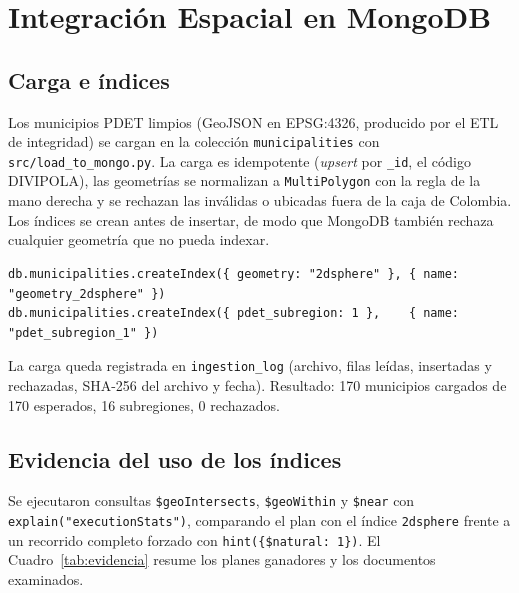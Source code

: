 \documentclass[12pt, letterpaper]{article}
\begin{document}
\section{Integración Espacial en MongoDB}

\subsection{Carga e índices}
Los municipios PDET limpios (GeoJSON en EPSG:4326, producido por el ETL de integridad) se cargan en la colección \texttt{municipalities} con \texttt{src/load\_to\_mongo.py}. La carga es idempotente (\emph{upsert} por \texttt{\_id}, el código DIVIPOLA), las geometrías se normalizan a \texttt{MultiPolygon} con la regla de la mano derecha y se rechazan las inválidas o ubicadas fuera de la caja de Colombia. Los índices se crean antes de insertar, de modo que MongoDB también rechaza cualquier geometría que no pueda indexar.

\begin{lstlisting}[style=lab,language=mongosh]
db.municipalities.createIndex({ geometry: "2dsphere" }, { name: "geometry_2dsphere" })
db.municipalities.createIndex({ pdet_subregion: 1 },    { name: "pdet_subregion_1" })
\end{lstlisting}

La carga queda registrada en \texttt{ingestion\_log} (archivo, filas leídas, insertadas y rechazadas, SHA-256 del archivo y fecha). Resultado: 170 municipios cargados de 170 esperados, 16 subregiones, 0 rechazados.

\subsection{Evidencia del uso de los índices}
Se ejecutaron consultas \texttt{\$geoIntersects}, \texttt{\$geoWithin} y \texttt{\$near} con \texttt{explain("executionStats")}, comparando el plan con el índice \texttt{2dsphere} frente a un recorrido completo forzado con \texttt{hint(\{\$natural: 1\})}. El Cuadro~\ref{tab:evidencia} resume los planes ganadores y los documentos examinados.
\end{document}
